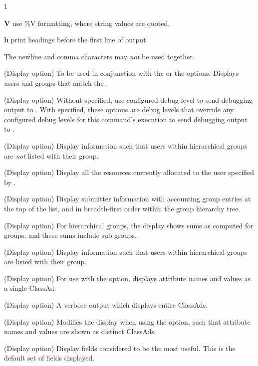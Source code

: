 \begin{ManPage}{\label{man-condor-userprio}}{1}
\begin{Options}
{  \textbf{V} use \%V formatting, where string values are quoted,

  \textbf{h} print headings before the first line of output.

  The newline and comma characters may \emph{not} be used together.
  }

  {(Display option) To be used in conjunction with the  
   or the  options.
  Displays users and groups that match the . }

  {(Display option) Without  specified, 
  use configured debug level to send debugging output to .
  With  specified, these options are debug levels that
  override any configured debug levels for this command's execution
  to send debugging output to .}

  {(Display option) Display information such that users within hierarchical
  groups are \emph{not} listed with their group. }

  {(Display option) Display all the resources currently allocated to the 
  user specified by .  }

  {(Display option) Display submitter information with accounting group
   entries at the top of the list, 
   and in breadth-first order within the group hierarchy tree.}

  {(Display option) For hierarchical groups,
  the display shows sums as computed for groups, 
  and these sums include sub groups.  }

  {(Display option) Display information such that users within hierarchical
  groups are listed with their group. }

  {(Display option) For use with the  option,
  displays attribute names and values as a single ClassAd. }

  {(Display option) A verbose output which displays entire ClassAds.  }

  {(Display option) Modifies the display when using the  option,
  such that attribute names and values are shown as distinct ClassAds. }

  {(Display option) Display fields considered to be the most useful.
  This is the default set of fields displayed.   }


\end{Options}
\end{ManPage}
